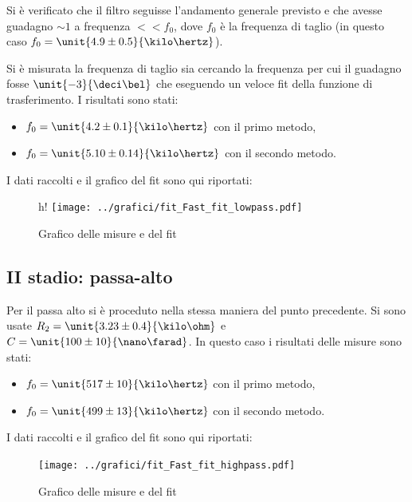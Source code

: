 \documentclass[10pt,a4paper]{article}
\begin{document}
Si è verificato che il filtro seguisse l'andamento generale previsto e che avesse guadagno $\sim 1$ a frequenza $<<f_0$, dove $f_0$ è la frequenza di taglio (in questo caso $f_0 = \unit{4.9 \pm 0.5}{\kilo\hertz}$).

Si è misurata la frequenza di taglio sia cercando la frequenza per cui il guadagno fosse $\unit{-3}{\deci\bel}$ che eseguendo un veloce fit della funzione di trasferimento.
I risultati sono stati:
\begin{itemize}
	\item $f_0 = \unit{4.2 \pm 0.1}{\kilo\hertz}$ con il primo metodo,
	\item $f_0 = \unit{5.10 \pm 0.14}{\kilo\hertz}$ con il secondo metodo.
\end{itemize}
I dati raccolti e il grafico del fit sono qui riportati:

\begin{figure}[h!]
	\centering
	
\end{figure}

\begin{figure}{h!}
	\centering
	\texttt{[image: ../grafici/fit\_Fast\_fit\_lowpass.pdf]}
	\caption{Grafico delle misure e del fit}
\end{figure}

\subsection{II stadio: passa-alto}
Per il passa alto si è proceduto nella stessa maniera del punto precedente. Si sono usate $R_2=\unit{3.23 \pm 0.4}{\kilo\ohm}$ e $C=\unit{100 \pm 10}{\nano\farad}$.
In questo caso i risultati delle misure sono stati:
\begin{itemize}
	\item $f_0 = \unit{517 \pm 10}{\kilo\hertz}$ con il primo metodo,
	\item $f_0 = \unit{499 \pm 13}{\kilo\hertz}$ con il secondo metodo.
\end{itemize}

I dati raccolti e il grafico del fit sono qui riportati:

\begin{figure}[h!]
	\centering
	
\end{figure}
	
\begin{figure}[h!]
	\centering
	\texttt{[image: ../grafici/fit\_Fast\_fit\_highpass.pdf]}
	\caption{Grafico delle misure e del fit}
\end{figure}
\end{document}
